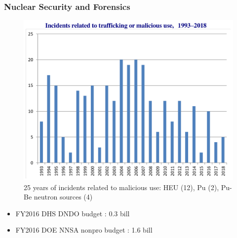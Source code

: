 \begin{frame}
  \frametitle{Nuclear Security and Forensics}
  \begin{minipage}{0.6\textwidth}
    \begin{figure}
      \centering
      \includegraphics[width=\textwidth]{./figures/nucleartrafficking.png}
      \caption{25 years of incidents related to malicious use: HEU (12), Pu (2), Pu-Be neutron sources (4)\cite{itdb}}
    \end{figure}
  \end{minipage}%
  \begin{minipage}{0.4\textwidth}
    \begin{itemize}
      \item FY2016 DHS DNDO budget : 0.3 bill
      \item FY2016 DOE NNSA nonpro budget : 1.6 bill
    \end{itemize}
  \end{minipage}
\end{frame}

